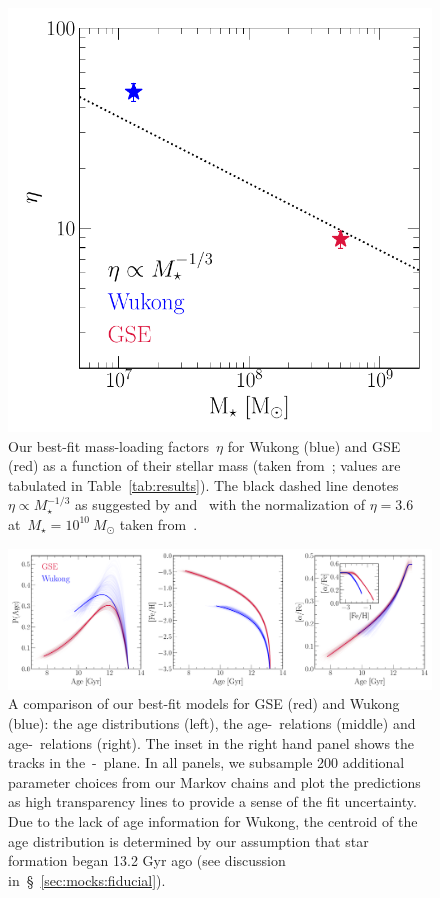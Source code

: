 \documentclass[ms.tex]{subfiles}
\begin{document}
\begin{figure}
\centering
\includegraphics[scale = 0.65]{gse_wukong_eta.pdf}
\caption{
Our best-fit mass-loading factors~$\eta$ for Wukong (blue) and GSE (red) as
a function of their stellar mass (taken from~\citealt{Naidu2022}; values are
tabulated in Table~\ref{tab:results}).
The black dashed line denotes~$\eta \propto M_\star^{-1/3}$ as suggested by
\citet{Finlator2008} and~\citet{Peeples2011} with the normalization of
$\eta = 3.6$ at~$M_\star = 10^{10}~M_\odot$ taken from~\citet{Muratov2015}.
}
\label{fig:gse_wukong_eta}
\end{figure}

\begin{figure}
\centering
\includegraphics[scale = 0.45]{gse_wukong_comparison.pdf}
\caption{
A comparison of our best-fit models for GSE (red) and Wukong (blue): the age
distributions (left), the age-\feh~relations (middle) and age-\afe~relations
(right).
The inset in the right hand panel shows the tracks in the~\afe-\feh~plane.
In all panels, we subsample 200 additional parameter choices from our Markov
chains and plot the predictions as high transparency lines to provide a sense
of the fit uncertainty.
Due to the lack of age information for Wukong, the centroid of the age
distribution is determined by our assumption that star formation began 13.2
Gyr ago (see discussion in~\S~\ref{sec:mocks:fiducial}).
}
\label{fig:comparison}
\end{figure}
\end{document}
